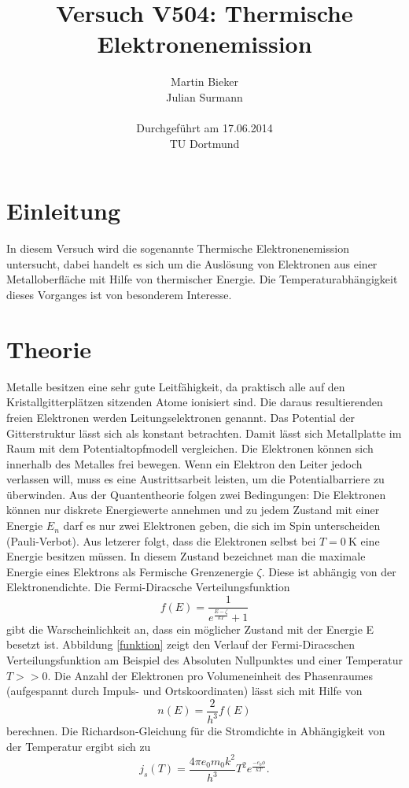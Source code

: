 \documentclass[11pt,ngerman,a4paper]{article}
\title{\textbf{Versuch V504: Thermische Elektronenemission}}
\author{Martin Bieker\\
Julian Surmann\\
\\
Durchgef\"{u}hrt am 17.06.2014\\
TU Dortmund}
\date{}
\begin{document}
\renewcommand\tablename{Tabelle}
\renewcommand\figurename{Abbildung}
\maketitle
\thispagestyle{empty}
\newpage
\clearpage
\setcounter{page}{1}


\section{Einleitung}
In diesem Versuch wird die sogenannte Thermische Elektronenemission untersucht, dabei handelt es sich um die Auslösung von Elektronen aus einer Metalloberfläche mit Hilfe von thermischer Energie. Die Temperaturabhängigkeit dieses Vorganges ist von besonderem Interesse.
\section{Theorie}
Metalle besitzen eine sehr gute Leitfähigkeit, da praktisch alle auf den Kristallgitterplätzen sitzenden Atome ionisiert sind. Die daraus resultierenden freien Elektronen werden Leitungselektronen genannt. Das Potential der Gitterstruktur lässt sich als konstant betrachten. Damit lässt sich Metallplatte im Raum mit dem Potentialtopfmodell vergleichen. Die Elektronen können sich innerhalb des Metalles frei bewegen. Wenn ein Elektron den Leiter jedoch verlassen will, muss es eine Austrittsarbeit leisten, um die Potentialbarriere zu überwinden. Aus der Quantentheorie folgen zwei Bedingungen: Die Elektronen können nur diskrete Energiewerte annehmen und zu jedem Zustand mit einer Energie $E_n$ darf es nur zwei Elektronen geben, die sich im Spin unterscheiden (Pauli-Verbot). Aus letzerer folgt, dass die Elektronen selbst bei $T = \SI{0}{\kelvin}$ eine Energie besitzen müssen. In diesem Zustand bezeichnet man die maximale Energie eines Elektrons als Fermische Grenzenergie $\zeta$. Diese ist abhängig von der Elektronendichte. Die Fermi-Diracsche Verteilungsfunktion
\begin{equation}
f(E) = \frac{1}{e^{\frac{E-\zeta}{k T}}+1}
\end{equation}
gibt die Warscheinlichkeit an, dass ein möglicher Zustand mit der Energie E besetzt ist.
Abbildung \ref{funktion} zeigt den Verlauf der Fermi-Diracschen Verteilungsfunktion am Beispiel des Absoluten Nullpunktes und einer Temperatur $T >> 0$.
\newline
Die Anzahl der Elektronen pro Volumeneinheit des Phasenraumes (aufgespannt durch Impuls- und Ortskoordinaten) lässt sich mit Hilfe von
\begin{equation}
n(E) = \frac{2}{h^3}f(E)
\end{equation}
berechnen. Die Richardson-Gleichung für die Stromdichte in Abhängigkeit von der Temperatur ergibt sich zu
\begin{equation}
j_s(T) = \frac{4\pi e_0 m_0 k^2}{h^3} T^2 e^{\frac{-e_0 \phi}{k T}}.
\end{equation}
\end{document}
